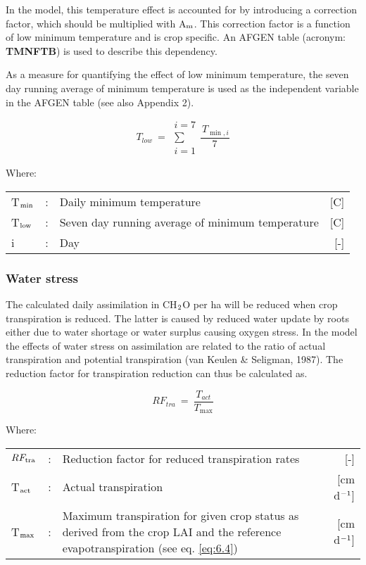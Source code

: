 In the model, this temperature effect is accounted for by introducing a correction factor,
which should be multiplied with A$_{{\rm m}}$. This correction factor is a function of low minimum
temperature and is crop specific. An AFGEN table (acronym: {\bf TMNFTB}) is used to
describe this dependency.

As a measure for quantifying the effect of low minimum temperature, the seven day
running average of minimum temperature is used as the independent variable in the
AFGEN table (see also Appendix 2).

\begin{equation}
T _{low} ~=~\begin{array}{c}{i=7}  \\
\sum  \\
{i=1}\end{array}{\frac{\, T _{\min ,i} }{7}}
\end{equation}

Where:\\[5pt]
\begin{tabularx}{\textwidth}{llXr}
	T$_{{\rm min}}$  &:& Daily minimum temperature   &     [\degrees C]\\
	T$_{{\rm low}}$ &:& Seven day running average of minimum temperature    &    [\degrees C]\\
	i &:& Day    &    [-]
\end{tabularx}


\subsubsection{Water stress}
\label{sec:AssimilationWaterStress}
The calculated daily assimilation in CH$_{{\rm 2}}$O per ha will be reduced when crop transpiration
is reduced. The latter is caused by reduced water update by roots either due to water shortage or water 
surplus causing oxygen stress. In the model the effects of water stress on assimilation are related 
to the ratio of actual transpiration and potential transpiration (van Keulen \& Seligman, 1987).
The reduction factor for transpiration reduction can thus be calculated as.

\begin{equation}
\label{eq:5.37}
RF_{tra} ~=~ {\frac{T _{act} }{T _{\max} }}
\end{equation}

Where:\\[5pt]
\begin{tabularx}{\textwidth}{llXr}
	$RF_{{\rm tra}}$ &:& Reduction factor for reduced transpiration rates   & [-]\\
	T$_{{\rm act}}$ &:& Actual transpiration   &     [cm d$^{{\rm -1}}$]\\
	T$_{{\rm \max}}$ &:& Maximum transpiration for given crop status as derived from the crop LAI
	and the reference evapotranspiration (see eq. \ref{eq:6.4})   &     [cm d$^{{\rm -1}}$]\\
\end{tabularx}

